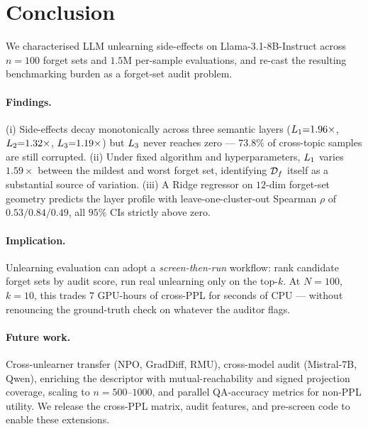 \section{Conclusion}
\label{sec:conclusion}

We characterised LLM unlearning side-effects on Llama-3.1-8B-Instruct across $n{=}100$ forget sets and $1.5$M per-sample evaluations, and re-cast the resulting benchmarking burden as a forget-set audit problem.

\paragraph{Findings.} (i) Side-effects decay monotonically across three semantic layers ($L_1{=}1.96\times$, $L_2{=}1.32\times$, $L_3{=}1.19\times$) but $L_3$ never reaches zero --- $73.8\%$ of cross-topic samples are still corrupted. (ii) Under fixed algorithm and hyperparameters, $L_1$ varies $1.59\times$ between the mildest and worst forget set, identifying $\mathcal{D}_f$ itself as a substantial source of variation. (iii) A Ridge regressor on $12$-dim forget-set geometry predicts the layer profile with leave-one-cluster-out Spearman $\rho$ of $0.53/0.84/0.49$, all $95\%$ CIs strictly above zero.

\paragraph{Implication.} Unlearning evaluation can adopt a \emph{screen-then-run} workflow: rank candidate forget sets by audit score, run real unlearning only on the top-$k$. At $N{=}100$, $k{=}10$, this trades $7$ GPU-hours of cross-PPL for seconds of CPU --- without renouncing the ground-truth check on whatever the auditor flags.

\paragraph{Future work.} Cross-unlearner transfer (NPO, GradDiff, RMU), cross-model audit (Mistral-7B, Qwen), enriching the descriptor with mutual-reachability and signed projection coverage, scaling to $n{=}500$--$1000$, and parallel QA-accuracy metrics for non-PPL utility. We release the cross-PPL matrix, audit features, and pre-screen code to enable these extensions.
